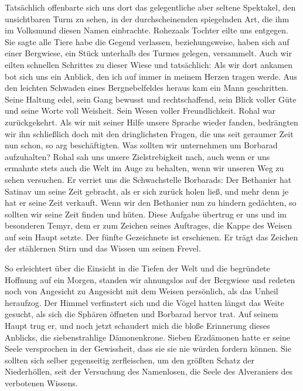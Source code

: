 Tatsächlich offenbarte sich uns dort das gelegentliche aber seltene Spektakel, den unsichtbaren Turm zu sehen, in der durchscheinenden spiegelnden Art, die ihm im Volksmund diesen Namen einbrachte. Rohezaals Tochter eilte uns entgegen. Sie sagte alle Tiere habe die Gegend verlassen, beziehungsweise, haben sich auf einer Bergwiese, ein Stück unterhalb des Turmes gelegen, versammelt. Auch wir eilten schnellen Schrittes zu dieser Wiese und tatsächlich: Als wir dort ankamen bot sich uns ein Anblick, den ich auf immer in meinem Herzen tragen werde. Aus den leichten Schwaden eines Bergnebelfeldes heraus kam ein Mann geschritten. Seine Haltung edel, sein Gang bewusst und rechtschaffend, sein Blick voller Güte und seine Worte voll Weisheit. Sein Wesen voller Freundlichkeit. Rohal war zurückgekehrt. Als wir mit seiner Hilfe unsere Sprache wieder fanden, bedrängten wir ihn schließlich doch mit den dringlichsten Fragen, die uns seit geraumer Zeit nun schon, so arg beschäftigten. Was sollten wir unternehmen um Borbarad aufzuhalten? Rohal sah uns unsere Zielstrebigkeit nach, auch wenn er uns ermahnte stets auch die Welt im Auge zu behalten, wenn wir unseren Weg zu sehen versuchen. Er verriet uns die Schwachstelle Borbarads: Der Bethanier hat Satinav um seine Zeit gebracht, als er sich zurück holen ließ, und mehr denn je hat er seine Zeit verkauft. Wenn wir den Bethanier nun zu hindern gedächten, so sollten wir seine Zeit finden und hüten. Diese Aufgabe übertrug er uns und im besonderen Temyr, dem er zum Zeichen seines Auftrages, die Kappe des Weisen auf sein Haupt setzte. Der fünfte Gezeichnete ist erschienen. Er trägt das Zeichen der stählernen Stirn und das Wissen um seinen Frevel.

So erleichtert über die Einsicht in die Tiefen der Welt und die begründete Hoffnung auf ein Morgen, standen wir ahnungslos auf der Bergwiese und redeten noch von Angesicht zu Angesicht mit dem Weisen persönlich, als das Unheil heraufzog. Der Himmel verfinstert sich und die Vögel hatten längst das Weite gesucht, als sich die Sphären öffneten und Borbarad hervor trat. Auf seinem Haupt trug er, und noch jetzt schaudert mich die bloße Erinnerung dieses Anblicks, die siebenstrahlige Dämonenkrone. Sieben Erzdämonen hatte er seine Seele versprochen in der Gewissheit, dass sie sie nie würden fordern können. Sie sollten sich selber gegenseitig zerfleischen, um den größten Schatz der Niederhöllen, seit der Versuchung des Namenlosen, die Seele des Alveraniers des verbotenen Wissens.

